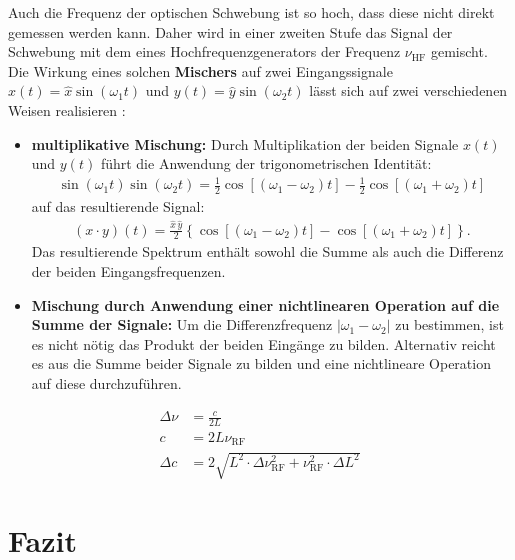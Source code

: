 \documentclass[11pt, a4paper]{article}
\numberwithin{equation}{section}
\begin{document}
Auch die Frequenz der optischen Schwebung ist so hoch, dass diese nicht direkt gemessen werden kann.
Daher wird in einer zweiten Stufe das Signal der Schwebung mit dem eines Hochfrequenzgenerators der Frequenz $\nu_\mathrm{HF}$ gemischt.
Die Wirkung eines solchen \textbf{Mischers} auf zwei Eingangssignale $x(t) = \hat{x} \sin(\omega_1 t)$ und $y(t) = \hat{y} \sin(\omega_2 t)$ lässt sich auf zwei verschiedenen Weisen realisieren \cite{horowitz_hill}:
\begin{itemize}
	\item \textbf{multiplikative Mischung:} Durch Multiplikation der beiden Signale $x(t)$ und $y(t)$ führt die Anwendung der trigonometrischen Identität:
	\begin{align}
		\sin(\omega_1 t) \sin(\omega_2 t) = \frac{1}{2} \cos\left[ (\omega_1 - \omega_2) t \right] - \frac{1}{2} \cos\left[ (\omega_1 + \omega_2) t\right]
	\end{align}
	auf das resultierende Signal:
	\begin{align}
		(x\cdot y)(t) = \frac{\hat{x} \, \hat{y}}{2} \left\{ \cos\left[ (\omega_1 - \omega_2) t \right] - \cos\left[ (\omega_1 + \omega_2) t\right]\right\} \text{.}
	\end{align}
	Das resultierende Spektrum enthält sowohl die Summe als auch die Differenz der beiden Eingangsfrequenzen.
	\item \textbf{Mischung durch Anwendung einer nichtlinearen Operation auf die Summe der Signale:} Um die Differenzfrequenz $|\omega_1 - \omega_2|$ zu bestimmen, ist es nicht nötig das Produkt der beiden Eingänge zu bilden.
	Alternativ reicht es aus die Summe beider Signale zu bilden und eine nichtlineare Operation auf diese durchzuführen.
	
\end{itemize}


\begin{align}
	\Delta \nu &= \frac{c}{2 L} \\
	c &= 2 L \nu_\mathrm{RF}\\
	\Delta c &= 2 \sqrt{ L^2 \cdot \Delta \nu_\mathrm{RF}^2 + \nu_\mathrm{RF}^2 \cdot \Delta L^2}
\end{align}

\section{Fazit}
\end{document}
